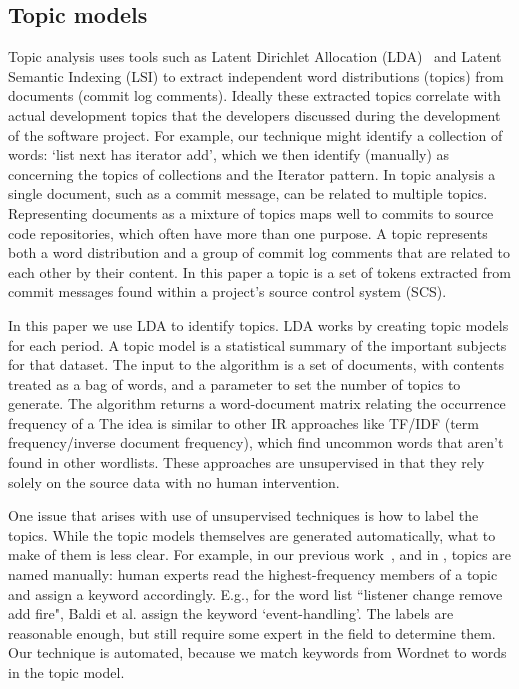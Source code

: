 \documentclass[10pt, conference, compsocconf]{IEEEtran}
\begin{document}
\subsection{Topic models}
Topic analysis uses tools such as Latent Dirichlet Allocation (LDA)~\cite{Blei2003} and Latent Semantic Indexing (LSI) to extract
independent word distributions (topics) from
	documents (commit log comments). %
Ideally these extracted topics 
correlate with actual development topics that the developers discussed
during the development of the software project. For example, our technique might identify a collection of words: `list next has iterator add', which we then identify (manually) as concerning the topics of collections and the Iterator pattern.
In topic analysis a single document, such as a commit message, can be related to multiple topics. Representing documents as a mixture of topics maps well to commits to source code repositories, which often have more than one purpose.  A topic
represents both a word distribution and a group of commit log comments
that are related to each other by their content.  In this paper a topic
is a set of tokens extracted from commit messages found within a
project's source control system (SCS).

In this paper we use LDA to identify topics.  LDA works by creating topic models for each period. A topic model is a statistical summary of the important subjects for that dataset.  The input to the algorithm is a set of documents, with contents treated as a bag of words, and a parameter to set the number of topics to generate. The algorithm returns a word-document matrix relating the occurrence frequency of a 
 The idea is similar to other IR approaches like TF/IDF (term frequency/inverse document frequency), which find uncommon words that aren't found in other wordlists. These approaches are unsupervised in that they rely solely on the source data with no human intervention.

One issue that arises with use of unsupervised techniques is how to label the topics. While the topic models themselves are generated automatically, what to make of them is less clear. For example, in our previous work~\cite{Hindle09ICSM}, and in \cite{Baldi2008}, topics are named manually: human experts read the highest-frequency members of a topic and assign a keyword accordingly. E.g., for the word list ``listener change remove add fire", Baldi et al. assign the keyword `event-handling'. The labels are reasonable enough, but still require some expert in the field to determine them. Our technique is automated, because we match keywords from Wordnet to words in the topic model. 
\end{document}
